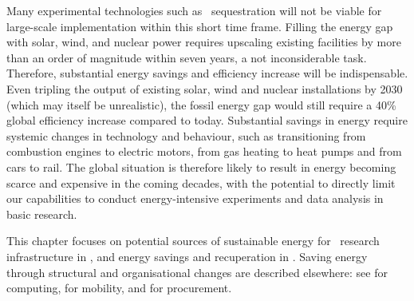 \documentclass[../SustainableHEP.tex]{subfiles}
\begin{document}

Many experimental technologies such as \CdO\ sequestration will not be viable for large-scale implementation within this short time frame. Filling the energy gap with solar, wind, and nuclear power requires upscaling existing facilities by more than an order of magnitude within seven years, a not inconsiderable task. Therefore, substantial energy savings and efficiency increase will be indispensable. Even tripling the output of existing solar, wind and nuclear installations by 2030 (which may itself be unrealistic), the fossil energy gap would still require a 40\% global efficiency increase compared to today. Substantial savings in energy require systemic changes in technology and behaviour, such as transitioning from combustion engines to electric motors, from gas heating to heat pumps and from cars to rail. The global situation is therefore likely to result in energy becoming scarce and expensive in the coming decades, with the potential to directly limit our capabilities to conduct energy-intensive experiments and data analysis in basic research.

This chapter focuses on potential sources of sustainable energy for \ACR\ research infrastructure in , and energy savings and recuperation in . Saving energy through structural and organisational changes are described elsewhere: see  for computing,  for mobility, and  for procurement.


\clearpage
\end{document}
